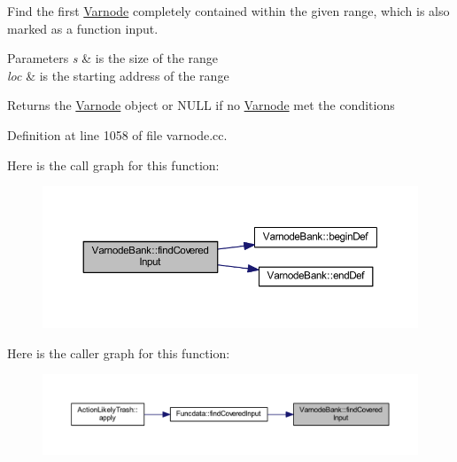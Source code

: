 Find the first \mbox{\hyperlink{class_varnode}{Varnode}} completely contained within the given range, which is also marked as a function input. 
\begin{DoxyParams}{Parameters}
{\em s} & is the size of the range \\
\hline
{\em loc} & is the starting address of the range \\
\hline
\end{DoxyParams}
\begin{DoxyReturn}{Returns}
the \mbox{\hyperlink{class_varnode}{Varnode}} object or N\+U\+LL if no \mbox{\hyperlink{class_varnode}{Varnode}} met the conditions 
\end{DoxyReturn}


Definition at line 1058 of file varnode.\+cc.

Here is the call graph for this function\+:
\nopagebreak
\begin{figure}[H]
\begin{center}
\leavevmode
\includegraphics[width=350pt]{class_varnode_bank_aacfc015d8ce76e8f1cacd6da9c7cd93f_cgraph}
\end{center}
\end{figure}
Here is the caller graph for this function\+:
\nopagebreak
\begin{figure}[H]
\begin{center}
\leavevmode
\includegraphics[width=350pt]{class_varnode_bank_aacfc015d8ce76e8f1cacd6da9c7cd93f_icgraph}
\end{center}
\end{figure}
\mbox{\label{class_varnode_bank_ae582ca41dcfbcb24895320c371113052}} 
